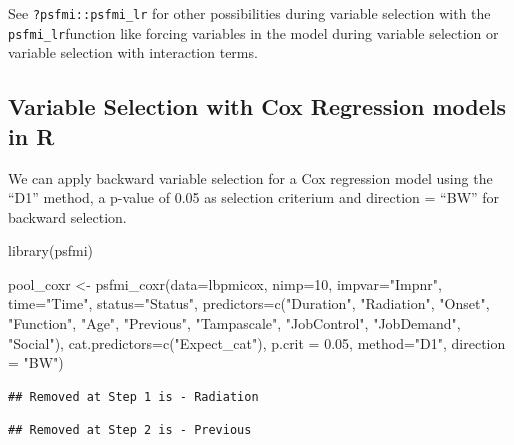 \documentclass[
]{book}
\newenvironment{Shaded}{\begin{snugshade}}{\end{snugshade}}
\newcommand{\AttributeTok}[1]{\textcolor[rgb]{0.77,0.63,0.00}{#1}}
\newcommand{\DecValTok}[1]{\textcolor[rgb]{0.00,0.00,0.81}{#1}}
\newcommand{\FloatTok}[1]{\textcolor[rgb]{0.00,0.00,0.81}{#1}}
\newcommand{\FunctionTok}[1]{\textcolor[rgb]{0.00,0.00,0.00}{#1}}
\newcommand{\NormalTok}[1]{#1}
\newcommand{\OtherTok}[1]{\textcolor[rgb]{0.56,0.35,0.01}{#1}}
\newcommand{\StringTok}[1]{\textcolor[rgb]{0.31,0.60,0.02}{#1}}
\begin{document}
See \texttt{?psfmi::psfmi\_lr} for other possibilities during variable selection with the \texttt{psfmi\_lr}function like forcing variables in the model during variable selection or variable selection with interaction terms.

\hypertarget{variable-selection-with-cox-regression-models-in-r}{%
\subsection{Variable Selection with Cox Regression models in R}\label{variable-selection-with-cox-regression-models-in-r}}

We can apply backward variable selection for a Cox regression model using the ``D1'' method, a p-value of 0.05 as selection criterium and direction = ``BW'' for backward selection.

\begin{Shaded}
\begin{Highlighting}[]
\FunctionTok{library}\NormalTok{(psfmi)}

\NormalTok{pool\_coxr }\OtherTok{\textless{}{-}} \FunctionTok{psfmi\_coxr}\NormalTok{(}\AttributeTok{data=}\NormalTok{lbpmicox, }\AttributeTok{nimp=}\DecValTok{10}\NormalTok{, }\AttributeTok{impvar=}\StringTok{"Impnr"}\NormalTok{, }\AttributeTok{time=}\StringTok{"Time"}\NormalTok{, }\AttributeTok{status=}\StringTok{"Status"}\NormalTok{,}
  \AttributeTok{predictors=}\FunctionTok{c}\NormalTok{(}\StringTok{"Duration"}\NormalTok{, }\StringTok{"Radiation"}\NormalTok{, }\StringTok{"Onset"}\NormalTok{, }\StringTok{"Function"}\NormalTok{, }\StringTok{"Age"}\NormalTok{,}
  \StringTok{"Previous"}\NormalTok{, }\StringTok{"Tampascale"}\NormalTok{, }\StringTok{"JobControl"}\NormalTok{, }\StringTok{"JobDemand"}\NormalTok{, }\StringTok{"Social"}\NormalTok{), }
  \AttributeTok{cat.predictors=}\FunctionTok{c}\NormalTok{(}\StringTok{"Expect\_cat"}\NormalTok{), }\AttributeTok{p.crit =} \FloatTok{0.05}\NormalTok{, }\AttributeTok{method=}\StringTok{"D1"}\NormalTok{, }\AttributeTok{direction =} \StringTok{"BW"}\NormalTok{)}
\end{Highlighting}
\end{Shaded}

\begin{verbatim}
## Removed at Step 1 is - Radiation
\end{verbatim}

\begin{verbatim}
## Removed at Step 2 is - Previous
\end{verbatim}
\end{document}
